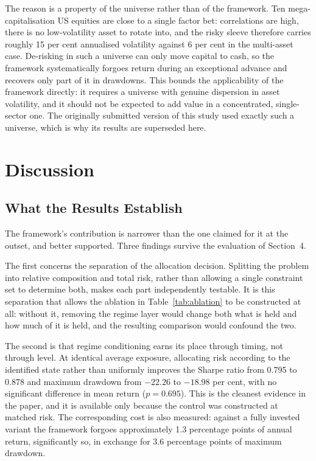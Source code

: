 \documentclass{singlecol-new}
\theoremstyle{TH}{
\newtheorem{lemma}{Lemma}
\newtheorem{theorem}[lemma]{Theorem}
\newtheorem{corrolary}[lemma]{Corrolary}
\newtheorem{conjecture}[lemma]{Conjecture}
\newtheorem{proposition}[lemma]{Proposition}
\newtheorem{claim}[lemma]{Claim}
\newtheorem{stheorem}[lemma]{Wrong Theorem}
\newtheorem{algorithm}{Algorithm}
}
\theoremstyle{THrm}{
\newtheorem{definition}{Definition}[section]
\newtheorem{question}{Question}[section]
\newtheorem{remark}{Remark}
\newtheorem{scheme}{Scheme}
}
\theoremstyle{THhit}{
\newtheorem{case}{Case}[section]
}
\begin{document}
The reason is a property of the universe rather than of the framework. Ten
mega-capitalisation US equities are close to a single factor bet: correlations are high,
there is no low-volatility asset to rotate into, and the risky sleeve therefore carries
roughly 15 per cent annualised volatility against 6 per cent in the multi-asset case.
De-risking in such a universe can only move capital to cash, so the framework
systematically forgoes return during an exceptional advance and recovers only part of it
in drawdowns. This bounds the applicability of the framework directly: it requires a
universe with genuine dispersion in asset volatility, and it should not be expected to
add value in a concentrated, single-sector one. The originally submitted version of this
study used exactly such a universe, which is why its results are superseded here.

\section{Discussion}
\label{sec:discussion}

\subsection{What the Results Establish}

The framework's contribution is narrower than the one claimed for it at the outset, and
better supported. Three findings survive the evaluation of Section~4.

The first concerns the separation of the allocation decision. Splitting the problem into
relative composition and total risk, rather than allowing a single constraint set to
determine both, makes each part independently testable. It is this separation that
allows the ablation in Table~\ref{tab:ablation} to be constructed at all: without it, removing the regime
layer would change both what is held and how much of it is held, and the resulting
comparison would confound the two.

The second is that regime conditioning earns its place through timing, not through
level. At identical average exposure, allocating risk according to the identified state
rather than uniformly improves the Sharpe ratio from 0.795 to 0.878 and maximum
drawdown from $-22.26$ to $-18.98$ per cent, with no significant difference in mean
return ($p = 0.695$). This is the cleanest evidence in the paper, and it is available only
because the control was constructed at matched risk. The corresponding cost is also
measured: against a fully invested variant the framework forgoes approximately 1.3
percentage points of annual return, significantly so, in exchange for 3.6 percentage
points of maximum drawdown.
\end{document}
